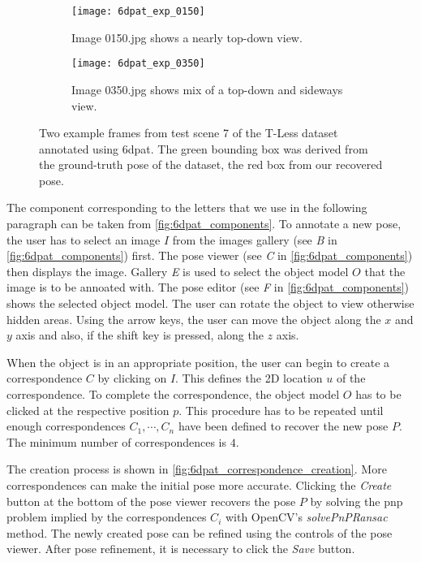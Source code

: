 \begin{figure}[!tbp]
	\centering
	\begin{subfigure}[t]{0.47\textwidth}
		\centering
    	\texttt{[image: 6dpat\_exp\_0150]}
    	\caption{Image 0150.jpg shows a nearly top-down view.}
    	\label{fig:6dpat_exp_0150}
	\end{subfigure}
	\hfill
	\begin{subfigure}[t]{0.47\textwidth}
	\centering
    	\texttt{[image: 6dpat\_exp\_0350]}
    	\caption{Image 0350.jpg shows mix of a top-down and sideways view.}
    	\label{fig:6dpat_exp_0500}
	\end{subfigure}
	\caption{Two example frames from test scene 7 of the T-Less dataset annotated using \ac{6dpat}. The green bounding box was derived from the ground-truth pose of the dataset, the red box from our recovered pose.}
	\label{fig:6dpat_exps}
\end{figure} 

The component corresponding to the letters that we use in the following paragraph can be taken from \fig \ref{fig:6dpat_components}. To annotate a new pose, the user has to select an image $I$ from the images gallery (see \textit{B} in \fig \ref{fig:6dpat_components}) first. The pose viewer (see \textit{C} in \fig \ref{fig:6dpat_components}) then displays the image. Gallery \textit{E} is used to select the object model $O$ that the image is to be annoated with. The pose editor (see \textit{F} in \fig \ref{fig:6dpat_components}) shows the selected object model. The user can rotate the object to view otherwise hidden areas. Using the arrow keys, the user can move the object along the $x$ and $y$ axis and also, if the shift key is pressed, along the $z$ axis. 

When the object is in an appropriate position, the user can begin to create a correspondence $C$ by clicking on $I$. This defines the 2D location $u$ of the correspondence. To complete the correspondence, the object model $O$ has to be clicked at the respective position $p$. This procedure has to be repeated until enough correspondences $C_1, \cdots, C_n$ have been defined to recover the new pose $P$. The minimum number of correspondences is $4$. 

The creation process is shown in \fig \ref{fig:6dpat_correspondence_creation}. More correspondences can make the initial pose more accurate. Clicking the \textit{Create} button at the bottom of the pose viewer recovers the pose $P$ by solving the \ac{pnp} problem implied by the correspondences $C_i$ with OpenCV's \textit{solvePnPRansac} method. The newly created pose can be refined using the controls of the pose viewer. After pose refinement, it is necessary to click the \textit{Save} button.

